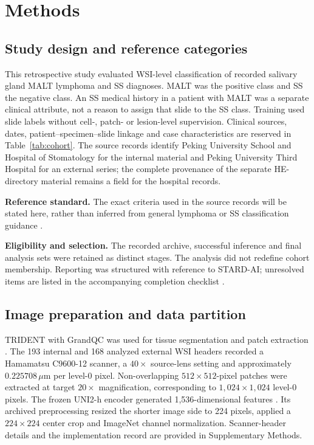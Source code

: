 \section{Methods}
\subsection{Study design and reference categories}
This retrospective study evaluated WSI-level classification of recorded salivary gland MALT lymphoma and SS diagnoses. MALT was the positive class and SS the negative class. An SS medical history in a patient with MALT was a separate clinical attribute, not a reason to assign that slide to the SS class. Training used slide labels without cell-, patch- or lesion-level supervision. Clinical sources, dates, patient--specimen--slide linkage and case characteristics are reserved in Table~\ref{tab:cohort}. The source records identify Peking University School and Hospital of Stomatology for the internal material and Peking University Third Hospital for an external series; the complete provenance of the separate HE-directory material remains a field for the hospital records.

\textbf{Reference standard.}  The exact criteria used in the source records will be stated here, rather than inferred from general lymphoma or SS classification guidance \citep{ref3,ref4,ref17}.

\textbf{Eligibility and selection.}  The recorded archive, successful inference and final analysis sets were retained as distinct stages. The analysis did not redefine cohort membership. Reporting was structured with reference to STARD-AI; unresolved items are listed in the accompanying completion checklist \citep{ref20}.

\subsection{Image preparation and data partition}
TRIDENT with GrandQC was used for tissue segmentation and patch extraction \citep{ref12}. The 193 internal and 168 analyzed external WSI headers recorded a Hamamatsu C9600-12 scanner, a $40\times$ source-lens setting and approximately $0.225708\,\mu\mathrm{m}$ per level-0 pixel. Non-overlapping $512\times512$-pixel patches were extracted at target $20\times$ magnification, corresponding to $1,024\times1,024$ level-0 pixels. The frozen UNI2-h encoder generated 1,536-dimensional features \citep{ref8,uni2card}. Its archived preprocessing resized the shorter image side to 224 pixels, applied a $224\times224$ center crop and ImageNet channel normalization.  Scanner-header details and the implementation record are provided in Supplementary Methods.


